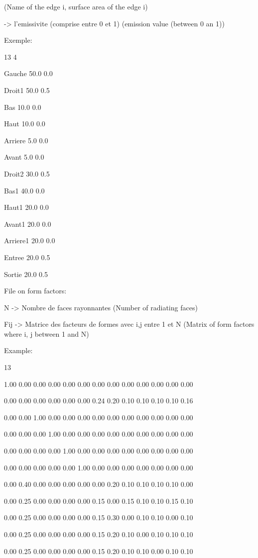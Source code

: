  (Name of the edge i, surface area of the edge i)

-> l'emissivite (comprise entre 0 et 1) (emission value (between 0 an 1))

Exemple:

13 4

Gauche  50.0 0.0

Droit1  50.0 0.5

Bas     10.0 0.0

Haut    10.0 0.0

Arriere  5.0 0.0

Avant    5.0 0.0

Droit2  30.0 0.5

Bas1    40.0 0.0

Haut1   20.0 0.0

Avant1  20.0 0.0

Arriere1 20.0 0.0

Entree  20.0 0.5

Sortie  20.0 0.5



File on form factors:

N       -> Nombre de faces rayonnantes (Number of radiating faces)

Fij     -> Matrice des facteurs de formes avec i,j entre 1 et N (Matrix of form factors where i, j between 1 and N)

Example:

13              

1.00 0.00 0.00 0.00 0.00 0.00 0.00 0.00 0.00 0.00 0.00 0.00 0.00

0.00 0.00 0.00 0.00 0.00 0.00 0.24 0.20 0.10 0.10 0.10 0.10 0.16

0.00 0.00 1.00 0.00 0.00 0.00 0.00 0.00 0.00 0.00 0.00 0.00 0.00

0.00 0.00 0.00 1.00 0.00 0.00 0.00 0.00 0.00 0.00 0.00 0.00 0.00

0.00 0.00 0.00 0.00 1.00 0.00 0.00 0.00 0.00 0.00 0.00 0.00 0.00

0.00 0.00 0.00 0.00 0.00 1.00 0.00 0.00 0.00 0.00 0.00 0.00 0.00

0.00 0.40 0.00 0.00 0.00 0.00 0.00 0.20 0.10 0.10 0.10 0.10 0.00

0.00 0.25 0.00 0.00 0.00 0.00 0.15 0.00 0.15 0.10 0.10 0.15 0.10

0.00 0.25 0.00 0.00 0.00 0.00 0.15 0.30 0.00 0.10 0.10 0.00 0.10

0.00 0.25 0.00 0.00 0.00 0.00 0.15 0.20 0.10 0.00 0.10 0.10 0.10

0.00 0.25 0.00 0.00 0.00 0.00 0.15 0.20 0.10 0.10 0.00 0.10 0.10


